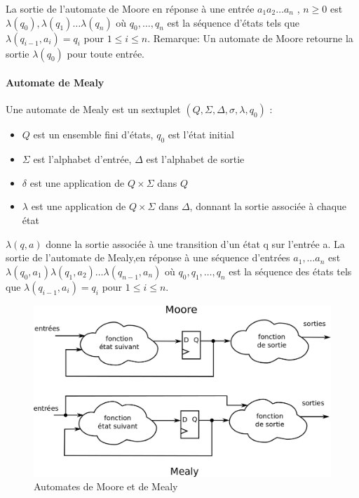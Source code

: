 La sortie de l'automate de Moore en réponse à une entrée $a_1 a_2\dots a_n$ , $n \geq 0$ est
$\lambda(q_0),\lambda(q_1)\dots \lambda(q_n)$ où
$q_0 ,\dots, q_n$ est la séquence d’états tels que $\lambda(q_{i-1},a_i) = q_i$ pour $1 \leq i \leq n$.
Remarque: Un automate de Moore retourne la sortie $\lambda(q_0)$ pour toute entrée.

\paragraph{Automate de Mealy}

Une automate de Mealy est un sextuplet $(Q, \Sigma, \Delta, \sigma, \lambda, q_0 )$ :
\begin{itemize}
\item $Q$ est un ensemble fini d’états, $q_0$ est l’état initial
\item $\Sigma$ est l’alphabet d’entrée, $\Delta$ est l’alphabet de sortie
\item $\delta$ est une application de $Q \times \Sigma $ dans $Q$
\item $\lambda$  est une application de $Q\times \Sigma$ dans $\Delta$, donnant la sortie associée à chaque état
\end{itemize}

$\lambda(q, a)$ donne la sortie associée à une transition d’un état q sur l’entrée a.
La sortie de l'automate de Mealy,en réponse à une séquence d’entrées $a_1,\dots a_n$ est
$\lambda(q_0, a_1) \lambda(q_1 , a_2 ) \dots \lambda(q_{n-1}, a_n)$
où $q_0 , q_1 ,\dots, q_n$ est la séquence des états tels que
$\lambda(q_{i-1}, a_i) = q_i$ pour $1 \leq i \leq n$.

\begin{figure}[h!]
  \centering
  \includegraphics[scale=0.25]{./figures/moore_mealy.png}
  \caption{Automates de Moore et de Mealy}
  \label{fig:mealy_moore}
\end{figure}

